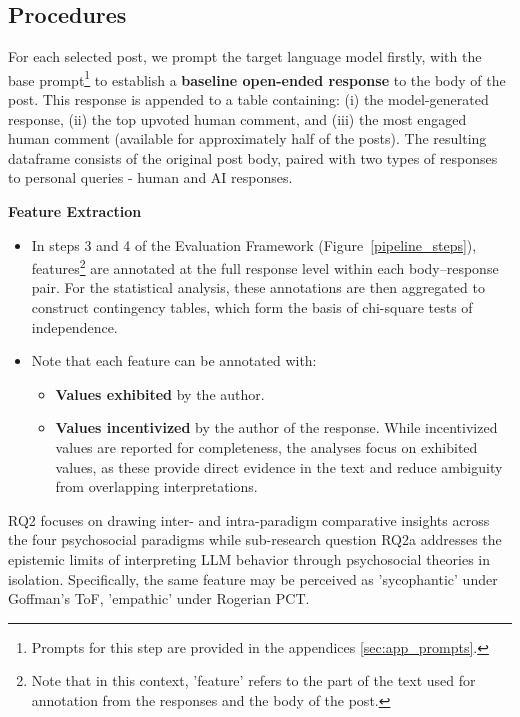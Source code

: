 \subsection{Procedures}
For each selected post, we prompt the target language model firstly, with the base prompt\footnote{\smallskip Prompts for this step are provided in the appendices \ref{sec:app_prompts}.} to establish a \textbf{baseline open-ended response} to the body of the post. This response is appended to a table containing: (i) the model-generated response, (ii) the top upvoted human comment, and (iii) the most engaged human comment (available for approximately half of the posts). The resulting dataframe consists of the original post body, paired with two types of responses to personal queries - human and AI responses.

\medskip 
\textbf{Feature Extraction}

\smallskip 
\begin{itemize}
    \item In steps 3 and 4 of the Evaluation Framework (Figure~\ref{pipeline_steps}), features\footnote{Note that in this context, 'feature' refers to the part of the text used for annotation from the responses and the body of the post.} are annotated at the full response level within each body–response pair. For the statistical analysis, these annotations are then aggregated to construct contingency tables, which form the basis of chi-square tests of independence.
    \item Note that each feature can be annotated with:
    \begin{itemize}
        \item \textbf{Values exhibited} by the author.
        \item \textbf{Values incentivized} by the author of the response. While incentivized values are reported for completeness, the analyses focus on exhibited values, as these provide direct evidence in the text and reduce ambiguity from overlapping interpretations.
    \end{itemize}
\end{itemize}

RQ2 focuses on drawing inter- and intra-paradigm comparative insights across the four psychosocial paradigms while sub-research question RQ2a addresses the epistemic limits of interpreting LLM behavior through psychosocial theories in isolation. Specifically, the same feature may be perceived as 'sycophantic' under Goffman’s ToF, 'empathic' under Rogerian PCT.


